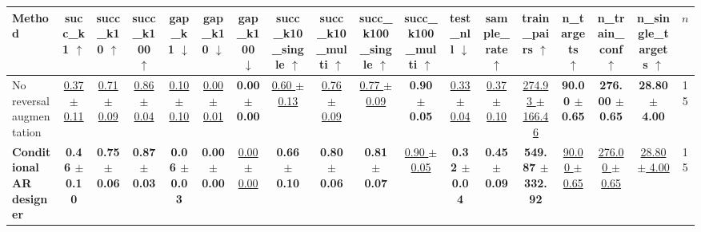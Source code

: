 \begin{tabular}{lccccccccccccccccc}
\toprule
Method & succ\_k1 $\uparrow$ & succ\_k10 $\uparrow$ & succ\_k100 $\uparrow$ & gap\_k1 $\downarrow$ & gap\_k10 $\downarrow$ & gap\_k100 $\downarrow$ & succ\_k10\_single $\uparrow$ & succ\_k10\_multi $\uparrow$ & succ\_k100\_single $\uparrow$ & succ\_k100\_multi $\uparrow$ & test\_nll $\downarrow$ & sample\_rate $\uparrow$ & train\_pairs $\uparrow$ & n\_targets $\uparrow$ & n\_train\_conf $\uparrow$ & n\_single\_targets $\uparrow$ & $n$ \\
\midrule
No reversal augmentation & \underline{0.37 $\pm$ 0.11} & \underline{0.71 $\pm$ 0.09} & \underline{0.86 $\pm$ 0.04} & \underline{0.10 $\pm$ 0.10} & \underline{0.00 $\pm$ 0.01} & \textbf{0.00 $\pm$ 0.00} & \underline{0.60 $\pm$ 0.13} & \underline{0.76 $\pm$ 0.09} & \underline{0.77 $\pm$ 0.09} & \textbf{0.90 $\pm$ 0.05} & \underline{0.33 $\pm$ 0.04} & \underline{0.37 $\pm$ 0.10} & \underline{274.93 $\pm$ 166.46} & \textbf{90.00 $\pm$ 0.65} & \textbf{276.00 $\pm$ 0.65} & \textbf{28.80 $\pm$ 4.00} & 15 \\
\textbf{Conditional AR designer} & \textbf{0.46 $\pm$ 0.10} & \textbf{0.75 $\pm$ 0.06} & \textbf{0.87 $\pm$ 0.03} & \textbf{0.06 $\pm$ 0.03} & \textbf{0.00 $\pm$ 0.00} & \underline{0.00 $\pm$ 0.00} & \textbf{0.66 $\pm$ 0.10} & \textbf{0.80 $\pm$ 0.06} & \textbf{0.81 $\pm$ 0.07} & \underline{0.90 $\pm$ 0.05} & \textbf{0.32 $\pm$ 0.04} & \textbf{0.45 $\pm$ 0.09} & \textbf{549.87 $\pm$ 332.92} & \underline{90.00 $\pm$ 0.65} & \underline{276.00 $\pm$ 0.65} & \underline{28.80 $\pm$ 4.00} & 15 \\
\bottomrule
\end{tabular}
